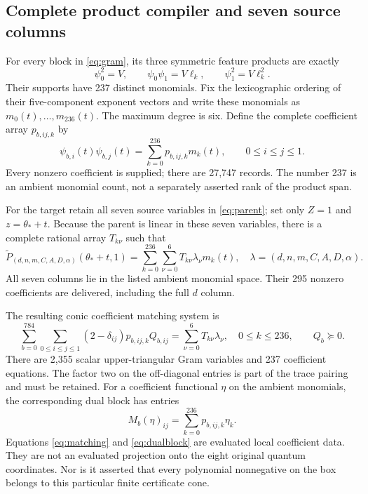 \subsection{Complete product compiler and seven source columns}
\label{sec:compiler}

For every block in \eqref{eq:gram}, its three symmetric feature products are
exactly
\begin{equation}
 \psi_0^2=V,\qquad \psi_0\psi_1=V\ell_k,\qquad
 \psi_1^2=V\ell_k^2.
 \label{eq:products}
\end{equation}
Their supports have 237 distinct monomials. Fix the lexicographic ordering
of their five-component exponent vectors and write these monomials as
$m_0(t),\ldots,m_{236}(t)$. The maximum degree is six. Define the complete
coefficient array $p_{b,ij,k}$ by
\begin{equation}
 \psi_{b,i}(t)\psi_{b,j}(t)=\sum_{k=0}^{236}p_{b,ij,k}m_k(t),
 \qquad 0\leq i\leq j\leq1.
 \label{eq:productmap}
\end{equation}
Every nonzero coefficient is supplied; there are 27,747 records. The number
237 is an ambient monomial count, not a separately asserted rank of the
product span.

For the target retain all seven source variables in \eqref{eq:parent}; set
only $Z=1$ and $z=\theta_*+t$. Because the parent is linear in these seven
variables, there is a complete rational array $T_{k\nu}$ such that
\begin{equation}
 \widetilde P_{(d,n,m,C,A,D,\alpha)}(\theta_*+t,1)
 =\sum_{k=0}^{236}\sum_{\nu=0}^6 T_{k\nu}\lambda_\nu m_k(t),
 \quad\lambda=(d,n,m,C,A,D,\alpha).
 \label{eq:target}
\end{equation}
All seven columns lie in the listed ambient monomial space. Their 295
nonzero coefficients are delivered, including the full $d$ column.

The resulting conic coefficient matching system is
\begin{equation}
 \sum_{b=0}^{784}\sum_{0\leq i\leq j\leq1}
       (2-\delta_{ij})p_{b,ij,k}Q_{b,ij}
  =\sum_{\nu=0}^6T_{k\nu}\lambda_\nu,\quad 0\leq k\leq236,
 \qquad Q_b\succeq0.
 \label{eq:matching}
\end{equation}
There are 2,355 scalar upper-triangular Gram variables and 237 coefficient
equations. The factor two on the off-diagonal entries is part of the trace
pairing and must be retained. For a coefficient functional $\eta$ on the
ambient monomials, the corresponding dual block has entries
\begin{equation}
 M_b(\eta)_{ij}=\sum_{k=0}^{236}p_{b,ij,k}\eta_k.
 \label{eq:dualblock}
\end{equation}
Equations \eqref{eq:matching} and \eqref{eq:dualblock} are evaluated local
coefficient data. They are not an evaluated projection onto the eight original
quantum coordinates. Nor is it asserted that every polynomial nonnegative
on the box belongs to this particular finite certificate cone.

